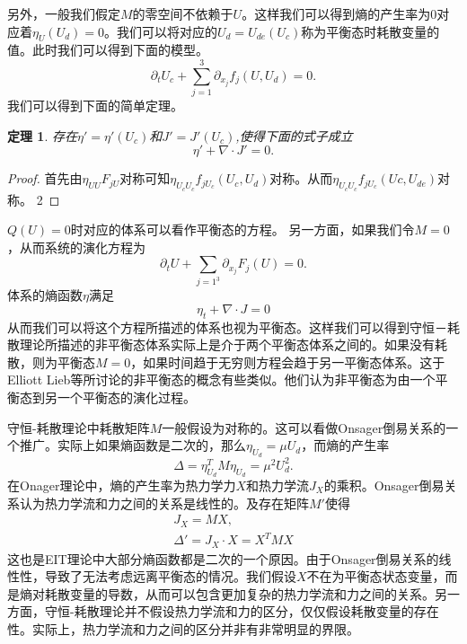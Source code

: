 \documentclass{article}
\newtheorem{theorem}{定理}
\begin{document}
	另外，一般我们假定$M$的零空间不依赖于$U$。这样我们可以得到熵的产生率为$0$对应着$\eta_U (U_d)= 0$。我们可以将对应的$U_d=U_{de}(U_c)$称为平衡态时耗散变量的值。此时我们可以得到下面的模型。
	\begin{equation*}
		\partial_t U_c + \sum_{j=1}^3 \partial_{x_j} f_j(U,U_d) = 0 .
	\end{equation*}	
	我们可以得到下面的简单定理。
	\begin{theorem}
		存在$\eta' = \eta'(U_c)$和$J' = J'(U_c)$,使得下面的式子成立
		\begin{equation*}
			\eta' + \nabla \cdot J' = 0.
		\end{equation*}
	\end{theorem}
	\begin{proof}
		首先由$\eta_{UU} F_{jU}$对称可知$\eta_{U_c U_c} f_{jU_c}(U_c,U_d)$对称。从而$\eta_{U_c U_c} f_{jU_c}(Uc, U_{de})$对称。
		2%
	\end{proof}
	$Q(U) = 0$时对应的体系可以看作平衡态的方程。
	另一方面，如果我们令$M=0$，从而系统的演化方程为
	\begin{equation*}
			\partial_t U + \sum_{j=1^3} \partial_{x_j} F_j(U) = 0 .
	\end{equation*}
	体系的熵函数$\eta$满足
	\begin{equation*}
		\eta_t + \nabla \cdot J = 0
	\end{equation*}
	从而我们可以将这个方程所描述的体系也视为平衡态。这样我们可以得到守恒－耗散理论所描述的非平衡态体系实际上是介于两个平衡态体系之间的。如果没有耗散，则为平衡态$M=0$，如果时间趋于无穷则方程会趋于另一平衡态体系。这于Elliott Lieb等所讨论的非平衡态的概念有些类似\cite{}。他们认为非平衡态为由一个平衡态到另一个平衡态的演化过程。
	
	守恒-耗散理论中耗散矩阵$M$一般假设为对称的。这可以看做Onsager倒易关系的一个推广。实际上如果熵函数是二次的，那么$\eta_{U_d} = \mu U_d$，而熵的产生率
	\begin{equation*}
		\Delta = \eta_{U_d}^T M \eta_{U_d} = \mu^2 U_d^2.
	\end{equation*}
	在Onager理论中，熵的产生率为热力学力$X$和热力学流$J_X$的乘积。Onsager倒易关系认为热力学流和力之间的关系是线性的。及存在矩阵$M'$使得
	\begin{eqnarray*}
		J_X = M X ,\\
		\Delta'= J_X \cdot X = X^T M X
	\end{eqnarray*}
	这也是EIT理论中大部分熵函数都是二次的一个原因。由于Onsager倒易关系的线性性，导致了无法考虑远离平衡态的情况。我们假设$X$不在为平衡态状态变量，而是熵对耗散变量的导数，从而可以包含更加复杂的热力学流和力之间的关系。另一方面，守恒-耗散理论并不假设热力学流和力的区分，仅仅假设耗散变量的存在性。实际上，热力学流和力之间的区分并非有非常明显的界限。
\end{document}
